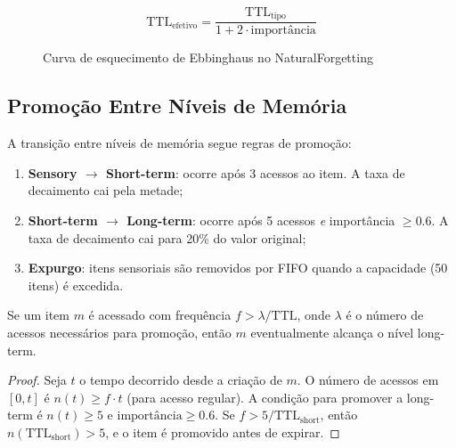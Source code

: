 \[
\text{TTL}_{\text{efetivo}} = \frac{\text{TTL}_{\text{tipo}}}{1 + 2
\cdot \text{importância}}
\]

\begin{figure}[htb]
\centering
\caption{Curva de esquecimento de Ebbinghaus no NaturalForgetting}
\label{fig:ebbinghaus}
\end{figure}

\subsection{Promoção Entre Níveis de Memória}

A transição entre níveis de memória segue regras de promoção:

\begin{enumerate}
\item \textbf{Sensory $\to$ Short-term}: ocorre após 3 acessos ao
item. A taxa de decaimento cai pela metade;
\item \textbf{Short-term $\to$ Long-term}: ocorre após 5 acessos
\emph{e} importância $\geq 0.6$. A taxa de decaimento cai para 20\%
do valor original;
\item \textbf{Expurgo}: itens sensoriais são removidos por FIFO quando
a capacidade (50 itens) é excedida.
\end{enumerate}

\begin{teorema}
Se um item $m$ é acessado com frequência $f > \lambda/\text{TTL}$,
onde $\lambda$ é o número de acessos necessários para promoção, então
$m$ eventualmente alcança o nível long-term.
\end{teorema}
\begin{proof}
Seja $t$ o tempo decorrido desde a criação de $m$. O número de
acessos em $[0, t]$ é $n(t) \geq f \cdot t$ (para acesso regular).
A condição para promover a long-term é $n(t) \geq 5$ e
$\text{importância} \geq 0.6$. Se $f > 5/\text{TTL}_{\text{short}}$,
então $n(\text{TTL}_{\text{short}}) > 5$, e o item é promovido antes
de expirar.
\end{proof}

